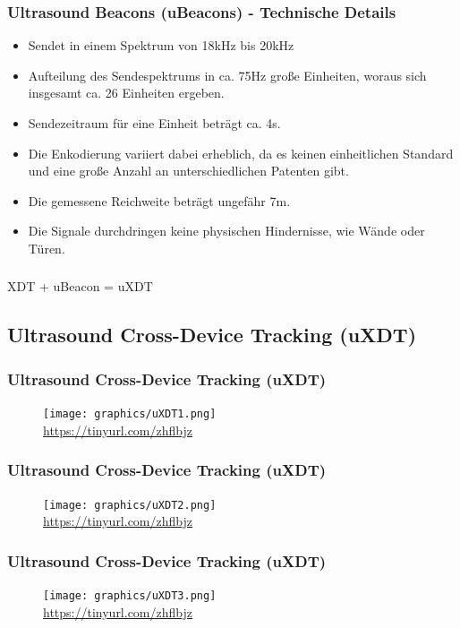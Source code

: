 \documentclass{beamer}
\begin{document}
		
		\begin{frame}\frametitle{Ultrasound Beacons (uBeacons) - Technische Details}
		\begin{itemize}
			\item Sendet in einem Spektrum von 18kHz bis 20kHz
			\item Aufteilung des Sendespektrums in  ca. 75Hz große Einheiten, woraus sich insgesamt ca. 26 Einheiten ergeben.
			\item Sendezeitraum für eine Einheit beträgt  ca. 4s.
			\item Die Enkodierung variiert dabei erheblich, da es keinen einheitlichen Standard und eine große Anzahl an unterschiedlichen Patenten gibt.
			\item Die gemessene Reichweite beträgt ungefähr 7m.
			\item Die Signale durchdringen keine physischen Hindernisse, wie Wände oder Türen.
		\end{itemize}
		\end{frame}
		
		\begin{frame}\frametitle{}
		\center\huge{XDT + uBeacon = uXDT}
		\end{frame}

	\subsection{Ultrasound Cross-Device Tracking (uXDT)}
		\begin{frame}\frametitle{Ultrasound Cross-Device Tracking (uXDT)}
		\begin{figure}[h]
			\centering
			\texttt{[image: graphics/uXDT1.png]}\\
			\tiny\url{https://tinyurl.com/zhflbjz}
		\end{figure}
		\end{frame}
		
		\begin{frame}\frametitle{Ultrasound Cross-Device Tracking (uXDT)}
		\begin{figure}[h]
			\centering
			\texttt{[image: graphics/uXDT2.png]}\\
			\tiny\url{https://tinyurl.com/zhflbjz}
		\end{figure}
		\end{frame}
		
		\begin{frame}\frametitle{Ultrasound Cross-Device Tracking (uXDT)}
		\begin{figure}[h]
			\centering
			\texttt{[image: graphics/uXDT3.png]}\\
			\tiny\url{https://tinyurl.com/zhflbjz}
		\end{figure}
		\end{frame}
\end{document}
